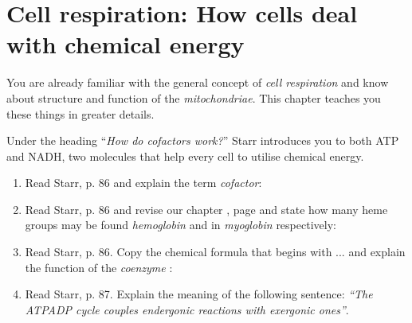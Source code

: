 \section{Cell respiration: How cells deal with chemical energy}

You are already familiar with the general concept of \emph{cell respiration} and know about structure and function of the \emph{mitochondriae}. This chapter teaches you these things in greater details.

		\begin{mdframed}[style=exampledefault, userdefinedwidth=12cm,frametitle={Starr, chapter 5.5}\label{mat:BEISPIELMATERIAL}]	  
			Under the heading ``\textit{How do cofactors work?}'' Starr introduces you to both ATP and NADH, two molecules that help every cell to utilise chemical energy.
		\end{mdframed}

\begin{enumerate}[itemsep=1.5em, leftmargin=*]
\item  Read  Starr, p. 86 and explain the term \emph{cofactor}:\\
	

\item  Read  Starr, p. 86 and revise our chapter , page \pageref{sec:RespiratorySystem} and state how many heme groups may be found \emph{hemoglobin} and in \emph{myoglobin} respectively:\\
	

\item  Read  Starr, p. 86. Copy the chemical formula that begins with   ... and explain the function of the \emph{coenzyme}  \/ :\\
	
\item  Read  Starr, p. 87. Explain the meaning of the following sentence: \textit{``The ATP\/ADP cycle couples endergonic reactions with exergonic ones''}.\\
\end{enumerate}

